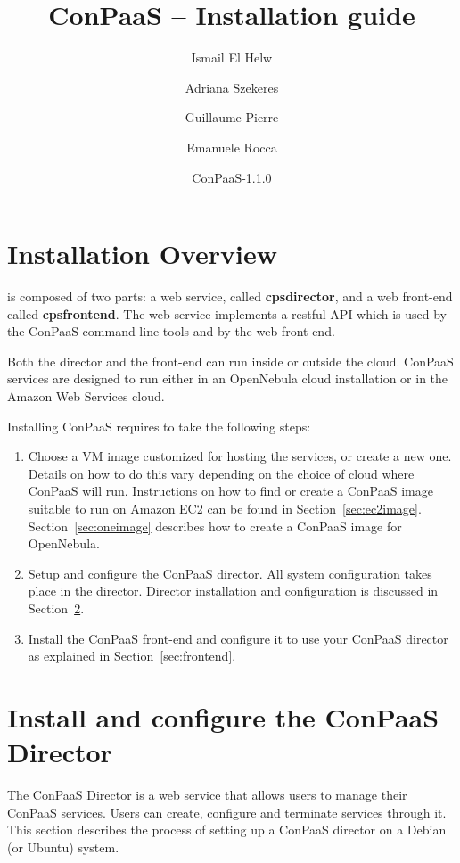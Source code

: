 \documentclass[10pt]{article}
\title{ConPaaS -- Installation guide\htmlonly{ [\xml{a href="installation.pdf"}pdf\xml{/a}]}}
\author{Ismail El Helw \and Adriana Szekeres \and Guillaume Pierre \and Emanuele Rocca}
\date{ConPaaS-1.1.0}
\begin{document}
\maketitle

\T\vfil
\T\tableofcontents
\T\vfil
\T\newpage

\section{Installation Overview}
\label{sec:overview}

 is composed of two parts: a web service,
called \textbf{cpsdirector}, and a web front-end called \textbf{cpsfrontend}.
The web service implements a restful API which is used by the ConPaaS command
line tools and by the web front-end.

Both the director and the front-end can run inside or outside the cloud.
ConPaaS services are designed to run either in an OpenNebula cloud
installation or in the Amazon Web Services cloud.

Installing ConPaaS requires to take the following steps:

\begin{enumerate}
\item Choose a VM image customized for hosting the services, or create a new
one. Details on how to do this vary depending on the choice of cloud where
ConPaaS will run. Instructions on how to find or create a ConPaaS image
suitable to run on Amazon EC2 can be found in Section~\ref{sec:ec2image}. 
Section~\ref{sec:oneimage} describes how to create a ConPaaS image for OpenNebula.
\item Setup and configure the ConPaaS director. All system
  configuration takes place in the director. Director installation and
  configuration is discussed in Section~\ref{sec:director}.
\item Install the ConPaaS front-end and configure it to use your ConPaaS
  director as explained in Section~\ref{sec:frontend}.
\end{enumerate}

\section{Install and configure the ConPaaS Director}
\label{sec:director}

The ConPaaS Director is a web service that allows users to manage their ConPaaS
services. Users can create, configure and terminate services through it. This
section describes the process of setting up a ConPaaS director on a Debian (or
Ubuntu) system.
\end{document}
